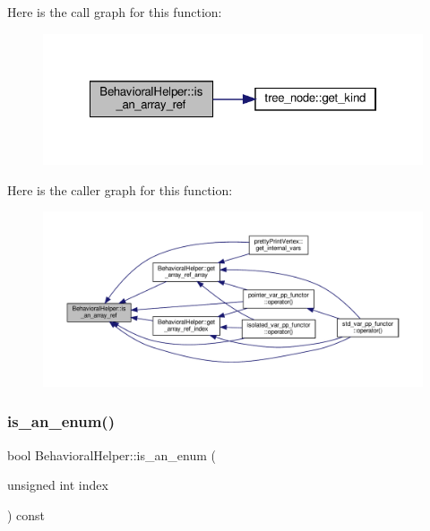 Here is the call graph for this function\+:
\nopagebreak
\begin{figure}[H]
\begin{center}
\leavevmode
\includegraphics[width=322pt]{dd/db2/classBehavioralHelper_af5d46a8fdf37f33a68436389fafc34b9_cgraph}
\end{center}
\end{figure}
Here is the caller graph for this function\+:
\nopagebreak
\begin{figure}[H]
\begin{center}
\leavevmode
\includegraphics[width=350pt]{dd/db2/classBehavioralHelper_af5d46a8fdf37f33a68436389fafc34b9_icgraph}
\end{center}
\end{figure}
\mbox{\label{classBehavioralHelper_a2b986a13b2680b8949a2221cad6820d7}} 
\subsubsection{\texorpdfstring{is\+\_\+an\+\_\+enum()}{is\_an\_enum()}}
{\footnotesize\ttfamily bool Behavioral\+Helper\+::is\+\_\+an\+\_\+enum (\begin{DoxyParamCaption}\item[{unsigned int}]{index }\end{DoxyParamCaption}) const\hspace{0.3cm}{\ttfamily [virtual]}}



